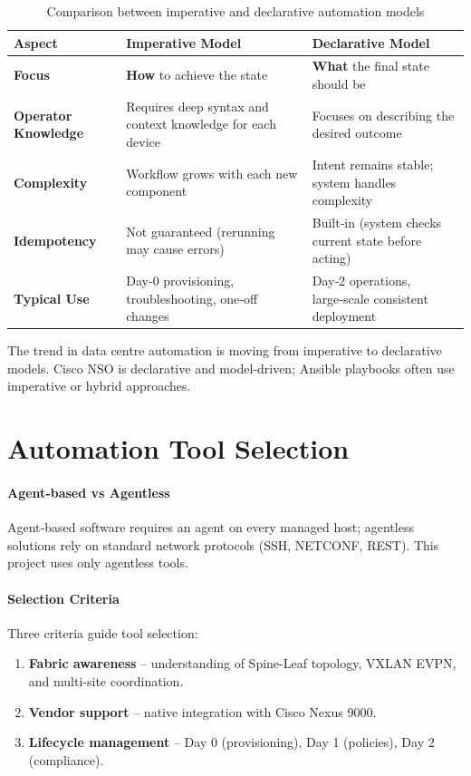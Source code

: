 \begin{table}[!htbp]
\centering
\small
\begin{tabularx}{\textwidth}{|p{3cm}|X|X|}
\hline
\textbf{Aspect} & \textbf{Imperative Model} & \textbf{Declarative Model} \\ \hline
\textbf{Focus} & \textbf{How} to achieve the state & \textbf{What} the final state should be \\ \hline
\textbf{Operator Knowledge} & Requires deep syntax and context knowledge for each device & Focuses on describing the desired outcome \\ \hline
\textbf{Complexity} & Workflow grows with each new component & Intent remains stable; system handles complexity \\ \hline
\textbf{Idempotency} & Not guaranteed (rerunning may cause errors) & Built‑in (system checks current state before acting) \\ \hline
\textbf{Typical Use} & Day‑0 provisioning, troubleshooting, one‑off changes & Day‑2 operations, large‑scale consistent deployment \\ \hline
\end{tabularx}
\caption{Comparison between imperative and declarative automation models}
\label{tab:imperative-declarative}
\end{table}

The trend in data centre automation is moving from imperative to declarative models. Cisco NSO is declarative and model‑driven; Ansible playbooks often use imperative or hybrid approaches.

\section{Automation Tool Selection}
\paragraph{Agent‑based vs Agentless}
Agent‑based software requires an agent on every managed host; agentless solutions rely on standard network protocols (SSH, NETCONF, REST). This project uses only agentless tools.

\paragraph{Selection Criteria}
Three criteria guide tool selection:
\begin{enumerate}
    \item \textbf{Fabric awareness} -- understanding of Spine-Leaf topology, VXLAN EVPN, and multi-site coordination.
    \item \textbf{Vendor support} -- native integration with Cisco Nexus 9000.
    \item \textbf{Lifecycle management} -- Day 0 (provisioning), Day 1 (policies), Day 2 (compliance).
\end{enumerate}

